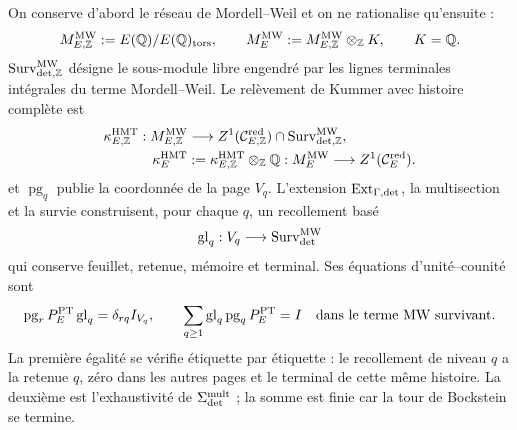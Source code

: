 On conserve d'abord le réseau de Mordell--Weil et on ne rationalise qu'ensuite :
\begin{equation}\label{eq:pdf2-bsd-mw-libre}
 M_{E,\mathbb Z}^{\rm MW}:=E(\mathbb Q)/E(\mathbb Q)_{\rm tors},
 \qquad
 M_E^{\rm MW}:=M_{E,\mathbb Z}^{\rm MW}\otimes_{\mathbb Z}K,
 \qquad K=\mathbb Q.
\end{equation}
$\operatorname{Surv}_{{\rm det},\mathbb Z}^{\rm MW}$ désigne le sous-module
libre engendré par les lignes terminales intégrales du terme
Mordell--Weil.
Le relèvement de Kummer avec histoire complète est
\begin{equation}\label{eq:pdf2-bsd-kummer-hmt}
 \begin{aligned}
 \kappa_{E,\mathbb Z}^{\rm HMT}:M_{E,\mathbb Z}^{\rm MW}
   &\longrightarrow
   Z^1(\mathcal C_{E,\mathbb Z}^{\rm red})
   \cap\operatorname{Surv}_{{\rm det},\mathbb Z}^{\rm MW},\\
 \kappa_E^{\rm HMT}&:=
   \kappa_{E,\mathbb Z}^{\rm HMT}\otimes_{\mathbb Z}\mathbb Q:
   M_E^{\rm MW}\longrightarrow Z^1(\mathcal C_E^{\rm red}).
 \end{aligned}
\end{equation}
et $\operatorname{pg}_q$ publie la coordonnée de la page $V_q$.
L'extension $\operatorname{Ext}_{\Gamma,{\rm det}}$, la multisection et la
survie construisent, pour chaque $q$, un recollement basé
\begin{equation}\label{eq:pdf2-bsd-glue-q}
 \operatorname{gl}_q:V_q\longrightarrow
 \operatorname{Surv}_{\rm det}^{\rm MW}
\end{equation}
qui conserve feuillet, retenue, mémoire et terminal. Ses équations
d'unité--counité sont
\begin{equation}\label{eq:pdf2-bsd-unidad-counidad-paginas}
 \operatorname{pg}_rP_E^{\rm PT}\operatorname{gl}_q
 =\delta_{rq}I_{V_q},
 \qquad
 \sum_{q\ge1}\operatorname{gl}_q
     \operatorname{pg}_qP_E^{\rm PT}=I
 \quad\text{dans le terme MW survivant}.
\end{equation}
La première égalité se vérifie étiquette par étiquette : le recollement de niveau
$q$ a la retenue $q$, zéro dans les autres pages et le terminal de cette même
histoire. La deuxième est l'exhaustivité de
$\Sigma_{\rm det}^{\rm mult}$ ; la somme est finie car la tour de Bockstein
se termine.

